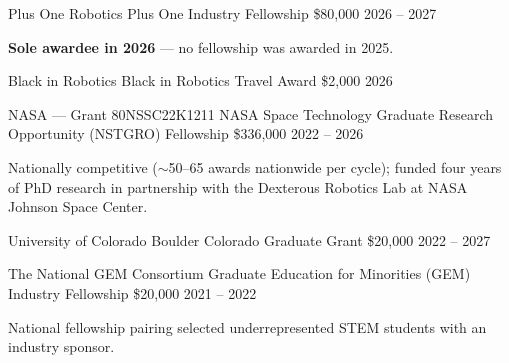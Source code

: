 %

\begin{cventries}

  \cventry
    {Plus One Robotics}
    {Plus One Industry Fellowship}
    {\$80,000}
    {2026 -- 2027}
    {
      \begin{cvitems}
        \item \textbf{Sole awardee in 2026} --- no fellowship was awarded in 2025.
      \end{cvitems}
    }

  \cventry
    {Black in Robotics}
    {Black in Robotics Travel Award}
    {\$2,000}
    {2026}
    {}

  \cventry
    {NASA --- Grant 80NSSC22K1211}
    {NASA Space Technology Graduate Research Opportunity (NSTGRO) Fellowship}
    {\$336,000}
    {2022 -- 2026}
    {
      \begin{cvitems}
        \item Nationally competitive ($\sim$50--65 awards nationwide per cycle); funded four years of PhD research in partnership with the Dexterous Robotics Lab at NASA Johnson Space Center.
      \end{cvitems}
    }

  \cventry
    {University of Colorado Boulder}
    {Colorado Graduate Grant}
    {\$20,000}
    {2022 -- 2027}
    {}

  \cventry
    {The National GEM Consortium}
    {Graduate Education for Minorities (GEM) Industry Fellowship}
    {\$20,000}
    {2021 -- 2022}
    {
      \begin{cvitems}
        \item National fellowship pairing selected underrepresented STEM students with an industry sponsor.
      \end{cvitems}
    }

\end{cventries}
